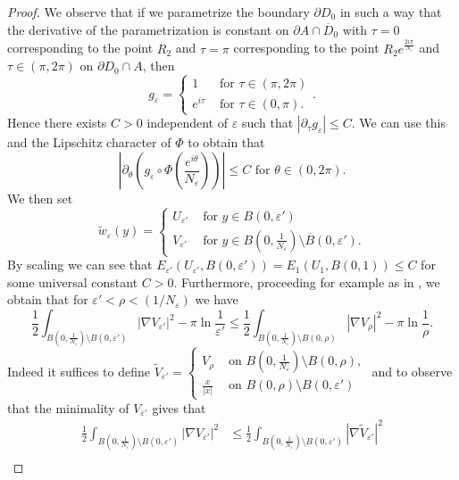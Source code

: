\documentclass[12pt,reqno]{amsart}
\def\e {{\varepsilon}}
\def \p {\partial}
\numberwithin{equation}{section}
\begin{document}
\begin{proof}
We observe that if we parametrize the boundary \(\p D_0\) in such a way that the derivative of the parametrization is constant on \(\p A \cap \overline{D}_0\) with \(\tau=0\) corresponding to the point \(R_2\) and \(\tau=\pi\) corresponding to the point \(R_2e^{\frac{2i\pi}{N_\e}}\) 
and \(\tau \in (\pi,2\pi)\) on \(\p D_0\cap A\), then 
\[g_\e=\begin{cases}
1 & \text{ for } \tau \in (\pi,2\pi) \\
e^{i\tau } & \text{ for } \tau \in (0,\pi).
\end{cases}.\]
Hence there exists \(C>0\) independent of \(\e\) such that \(|\p_\tau g_\e|\leq C\). We can use this and the Lipschitz character of \(\Phi\)  to obtain that 
\begin{equation}\label{eq:bound_derivative_g_phi}
|\p_\theta \left(g_\e\circ \Phi\left(\frac{e^{i\theta}}{N_\e} \right)\right)|\leq C \text{ for } \theta \in (0,2\pi).
\end{equation}
We then set
\begin{equation*}
\tilde{w}_\e(y)=\begin{cases}
U_{\e'} &\text{ for } y\in B(0,\e') \\
V_{\e'} & \text{ for } y \in B(0,\frac{1}{N_\e})\setminus \overline{B}(0,\e').
\end{cases}
\end{equation*}
By scaling we can see that \( E_{\e'}(U_{\e'},B(0,\e')) =E_1(U_1,B(0,1))\leq C\) for some universal constant \(C>0\). Furthermore, proceeding for example as in \cite[Proposition 2.9]{Monteil_Rodiac_VanSchaftingen_2022}, we obtain that for \(\e'<\rho<(1/N_\e)\) we have
\begin{equation}\label{eq:compa_monotonie}
\frac12 \int_{B(0,\frac{1}{N_\e})\setminus B(0,\e')}|\nabla V_{\e'}|^2-\pi \ln \frac{1}{\e'}\leq \frac12 \int_{B(0,\frac{1}{N_\e})\setminus B(0,\rho)}|\nabla V_\rho|^2-\pi \ln \frac{1}{\rho}.
\end{equation}
Indeed it suffices to define \( \tilde{V}_{\e'}=\begin{cases} V_\rho & \text{ on } B(0,\frac{1}{N_\e})\setminus B(0,\rho), \\
\frac{x}{|x|} & \text{ on } B(0,\rho)\setminus B(0,\e')\end{cases}\) and to observe that the minimality of \(V_{\e'}\) gives that 
\begin{align*}
\frac12 \int_{B(0,\frac{1}{N_\e})\setminus B(0,\e')}|\nabla V_{\e'}|^2 &\leq \frac12 \int_{B(0,\frac{1}{N_\e})\setminus B(0,\e')} |\nabla \tilde{V}_{\e'}|^2 \\

\end{align*}
\end{proof}
\end{document}
